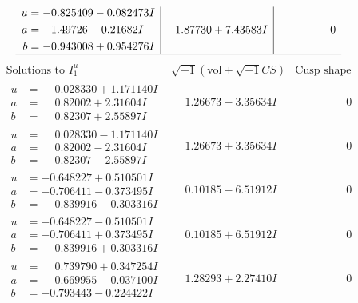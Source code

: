 \documentclass[1p]{elsarticle_modified}
\theoremstyle{definition}
\newcommand{\I}{\sqrt{-1}}
\begin{document}
$$\begin{array}{c|c|c}
\begin{aligned}
u &= -0.825409 - 0.082473 I \\
a &= -1.49726 - 0.21682 I \\
b &= -0.943008 + 0.954276 I\end{aligned}
 & \phantom{-}1.87730 + 7.43583 I & \phantom{-0.000000 } 0\\
 \hline 
 \end{array}$$\newpage$$\begin{array}{c|c|c}  
\text{Solutions to }I^u_{1}& \I (\text{vol} + \sqrt{-1}CS) & \text{Cusp shape}\\
 \hline 
\begin{aligned}
u &= \phantom{-}0.028330 + 1.171140 I \\
a &= \phantom{-}0.82002 + 2.31604 I \\
b &= \phantom{-}0.82307 + 2.55897 I\end{aligned}
 & \phantom{-}1.26673 - 3.35634 I & \phantom{-0.000000 } 0 \\ \hline\begin{aligned}
u &= \phantom{-}0.028330 - 1.171140 I \\
a &= \phantom{-}0.82002 - 2.31604 I \\
b &= \phantom{-}0.82307 - 2.55897 I\end{aligned}
 & \phantom{-}1.26673 + 3.35634 I & \phantom{-0.000000 } 0 \\ \hline\begin{aligned}
u &= -0.648227 + 0.510501 I \\
a &= -0.706411 - 0.373495 I \\
b &= \phantom{-}0.839916 - 0.303316 I\end{aligned}
 & \phantom{-}0.10185 - 6.51912 I & \phantom{-0.000000 } 0 \\ \hline\begin{aligned}
u &= -0.648227 - 0.510501 I \\
a &= -0.706411 + 0.373495 I \\
b &= \phantom{-}0.839916 + 0.303316 I\end{aligned}
 & \phantom{-}0.10185 + 6.51912 I & \phantom{-0.000000 } 0 \\ \hline\begin{aligned}
u &= \phantom{-}0.739790 + 0.347254 I \\
a &= \phantom{-}0.669955 - 0.037100 I \\
b &= -0.793443 - 0.224422 I\end{aligned}
 & \phantom{-}1.28293 + 2.27410 I & \phantom{-0.000000 } 0 \\ \hline\begin{aligned}

\end{aligned}
\end{array}$$
\end{document}
